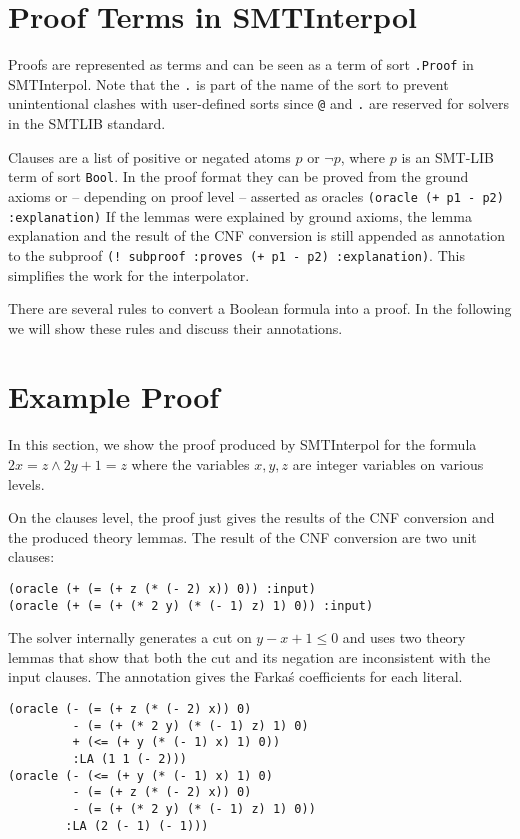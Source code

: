 \documentclass[a4paper]{article}
\newcommand\si{SMTInterpol\xspace}
\begin{document}
\section{Proof Terms in \si}
Proofs are represented as terms and can be seen as a term of sort
\verb+.Proof+ in \si.  Note that the
\verb+.+ is part of the name of the sort to prevent unintentional clashes with
user-defined sorts since \verb+@+ and \verb+.+ are reserved for solvers in the
SMTLIB standard.

Clauses are a list of positive or negated atoms $p$ or $\lnot p$, where $p$ is
an SMT-LIB term of sort \verb+Bool+.  In the proof format they can be
proved from the ground axioms or -- depending on proof level -- asserted
as oracles
\verb|(oracle (+ p1 - p2) :explanation)|
If the lemmas were explained by ground axioms, the lemma explanation and
the result of the CNF conversion is still appended as annotation to the subproof
\verb|(! subproof :proves (+ p1 - p2) :explanation)|.
This simplifies the work for the interpolator.

There are several rules to convert a Boolean formula into a proof.  In the
following we will show these rules and discuss their annotations.

\section{Example Proof}
In this section, we show the proof produced by \si for the
formula $2x=z \land 2y + 1 = z$ where the variables $x,y,z$ are integer
variables on various levels.

On the clauses level, the proof just gives the results of the CNF
conversion and the produced theory lemmas.  The result of the CNF
conversion are two unit clauses:
\begin{verbatim}
(oracle (+ (= (+ z (* (- 2) x)) 0)) :input)
(oracle (+ (= (+ (* 2 y) (* (- 1) z) 1) 0)) :input)
\end{verbatim}

The solver internally generates a cut on $y - x +1 \leq 0$ and uses two
theory lemmas that show that both the cut and its negation are
inconsistent with the input clauses.  The annotation gives the
Farka\'{s} coefficients for each literal.
\begin{verbatim}
(oracle (- (= (+ z (* (- 2) x)) 0)
         - (= (+ (* 2 y) (* (- 1) z) 1) 0)
         + (<= (+ y (* (- 1) x) 1) 0))
         :LA (1 1 (- 2)))
(oracle (- (<= (+ y (* (- 1) x) 1) 0)
         - (= (+ z (* (- 2) x)) 0)
         - (= (+ (* 2 y) (* (- 1) z) 1) 0))
        :LA (2 (- 1) (- 1)))
\end{verbatim}
\end{document}

